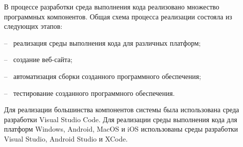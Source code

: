 В процессе разработки среда выполнения кода реализовано множество программных компонентов.
Общая схема процесса реализации состояла из
следующих этапов:

-- ~реализация среды выполнения кода для различных платформ;

-- ~создание веб-сайта;

-- ~автоматизация сборки созданного программного обеспечения;

-- ~тестирование созданного программного обеспечения.

Для реализации большинства компонентов системы была использована среда разработки Visual Studio Code.
Для реализации среды выполнения кода для платформ Windows, Android, MacOS и iOS использованы среды разработки Visual Studio, Android Studio и XCode.
